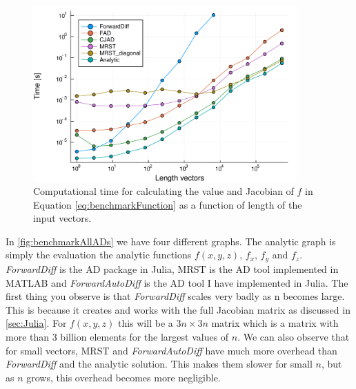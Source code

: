 \begin{figure}[H]
    \centering
    \includegraphics[width = 0.9\textwidth]{figures/benchmark_all_ADs.pdf}
    \caption{Computational time for calculating the value and Jacobian of $f$ in Equation \eqref{eq:benchmarkFunction} as a function of length of the input vectors.}
    \label{fig:benchmarkADVectorFunction}
\end{figure}
In \autoref{fig:benchmarkAllADs} we have four different graphs. The analytic graph is simply the evaluation the analytic functions $f(x,y,z)$, $f_x$, $f_y$ and $f_z$. \textit{ForwardDiff} is the AD package in Julia, MRST is the AD tool implemented in MATLAB and \textit{ForwardAutoDiff} is the AD tool I have implemented in Julia. The first thing you observe is that \textit{ForwardDiff} scales very badly as n becomes large. This is because it creates and works with the full Jacobian matrix as discussed in \autoref{sec:Julia}. For $f(x,y,z)$ this will be a $3n \times 3n$ matrix which is a matrix with more than 3 billion elements for the largest values of $n$. We can also observe that for small vectors, MRST and \textit{ForwardAutoDiff} have much more overhead than \textit{ForwardDiff} and the analytic solution. This makes them slower for small $n$, but as $n$ grows, this overhead becomes more negligible. 

